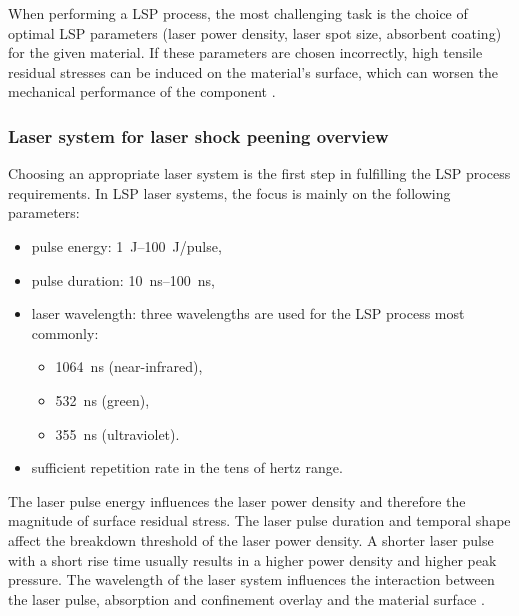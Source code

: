 When performing a LSP process, the most challenging task is the choice of optimal LSP parameters (laser power density, laser spot size, absorbent coating) for the given material. If these parameters are chosen incorrectly, high tensile residual stresses can be induced on the material's surface, which can worsen the mechanical performance of the component \cite{clauer_holbrook_fairand_1981}.  

\subsubsection*{Laser system for laser shock peening overview}

Choosing an appropriate laser system is the first step in fulfilling the LSP process requirements. In LSP laser systems, the focus is mainly on the following parameters:
\begin{itemize}

    \item pulse energy: \SIrange{1}{100}{\joule}/pulse,
    \item pulse duration: \SIrange{10}{100}{\nano\second},
    
    \item laser wavelength: three wavelengths are used for the LSP process most commonly:
    
    \begin{itemize}

        \item \SI{1064}{\nano\second} (near-infrared),
        \item \SI{532}{\nano\second} (green),
        \item \SI{355}{\nano\second} (ultraviolet).

    \end{itemize}
    
    \item sufficient repetition rate in the tens of hertz range.

\end{itemize}

The laser pulse energy influences the laser power density and therefore the magnitude of surface residual stress. 
The laser pulse duration and temporal shape affect the breakdown threshold of the laser power density. A shorter laser pulse with a short rise time usually results in a higher power density and higher peak pressure. 
The wavelength of the laser system influences the interaction between the laser pulse, absorption and confinement overlay and the material surface \cite{fabbro_peyre_berthe_scherpereel_1998}. 

